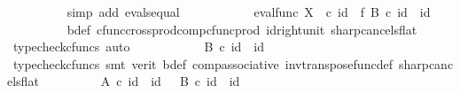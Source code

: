 \begin{isabellebody}
\ \ \ \ \ \ \ \ \isamarkupfalse%
\ {\isacharparenleft}{\kern0pt}simp\ add{\isacharcolon}{\kern0pt}\ evals{\isacharunderscore}{\kern0pt}equal{\isacharparenright}{\kern0pt}\isanewline
\ \ \ \ \ \ \isamarkupfalse%
\ \isamarkupfalse%
\ {\isachardoublequoteopen}{\isachardot}{\kern0pt}{\isachardot}{\kern0pt}{\isachardot}{\kern0pt}\ {\isacharequal}{\kern0pt}\ {\isacharparenleft}{\kern0pt}eval{\isacharunderscore}{\kern0pt}func\ X\ {\isasymone}{\isacharparenright}{\kern0pt}\ {\isasymcirc}\isactrlsub c\ {\isacharparenleft}{\kern0pt}id\ {\isasymone}\ {\isasymtimes}\isactrlsub f\ {\isacharparenleft}{\kern0pt}B\isactrlsup {\isasymflat}{\isacharparenright}{\kern0pt}\isactrlsup {\isasymsharp}{\isacharparenright}{\kern0pt}\ {\isasymcirc}\isactrlsub c\ {\isasymlangle}id\ {\isasymone}{\isacharcomma}{\kern0pt}\ id\ {\isasymone}{\isasymrangle}{\isachardoublequoteclose}\isanewline
\ \ \ \ \ \ \ \ \isamarkupfalse%
\ b{\isacharunderscore}{\kern0pt}def\ cfunc{\isacharunderscore}{\kern0pt}cross{\isacharunderscore}{\kern0pt}prod{\isacharunderscore}{\kern0pt}comp{\isacharunderscore}{\kern0pt}cfunc{\isacharunderscore}{\kern0pt}prod\ id{\isacharunderscore}{\kern0pt}right{\isacharunderscore}{\kern0pt}unit{}\ sharp{\isacharunderscore}{\kern0pt}cancels{\isacharunderscore}{\kern0pt}flat\ \isamarkupfalse%
\ {\isacharparenleft}{\kern0pt}typecheck{\isacharunderscore}{\kern0pt}cfuncs{\isacharcomma}{\kern0pt}\ auto{\isacharparenright}{\kern0pt}\isanewline
\ \ \ \ \ \ \isamarkupfalse%
\ \isamarkupfalse%
\ {\isachardoublequoteopen}{\isachardot}{\kern0pt}{\isachardot}{\kern0pt}{\isachardot}{\kern0pt}\ {\isacharequal}{\kern0pt}\ B\isactrlsup {\isasymflat}\ {\isasymcirc}\isactrlsub c\ {\isasymlangle}id\ {\isasymone}{\isacharcomma}{\kern0pt}\ id\ {\isasymone}{\isasymrangle}{\isachardoublequoteclose}\isanewline
\ \ \ \ \ \ \ \ \isamarkupfalse%
\ {\isacharparenleft}{\kern0pt}typecheck{\isacharunderscore}{\kern0pt}cfuncs{\isacharcomma}{\kern0pt}\ smt\ {\isacharparenleft}{\kern0pt}verit{\isacharparenright}{\kern0pt}\ b{\isacharunderscore}{\kern0pt}def\ comp{\isacharunderscore}{\kern0pt}associative{}\ inv{\isacharunderscore}{\kern0pt}transpose{\isacharunderscore}{\kern0pt}func{\isacharunderscore}{\kern0pt}def{}\ sharp{\isacharunderscore}{\kern0pt}cancels{\isacharunderscore}{\kern0pt}flat{\isacharparenright}{\kern0pt}\isanewline
\ \ \ \ \ \ \isamarkupfalse%
\ \isamarkupfalse%
\ {\isachardoublequoteopen}A\isactrlsup {\isasymflat}\ {\isasymcirc}\isactrlsub c\ {\isasymlangle}id\ {\isasymone}{\isacharcomma}{\kern0pt}\ id\ {\isasymone}{\isasymrangle}\ {\isacharequal}{\kern0pt}\ B\isactrlsup {\isasymflat}\ {\isasymcirc}\isactrlsub c\ {\isasymlangle}id\ {\isasymone}{\isacharcomma}{\kern0pt}\ id\ {\isasymone}{\isasymrangle}{\isachardoublequoteclose}\isacommand{{\isachardot}{\kern0pt}}\isamarkupfalse%

\end{isabellebody}

